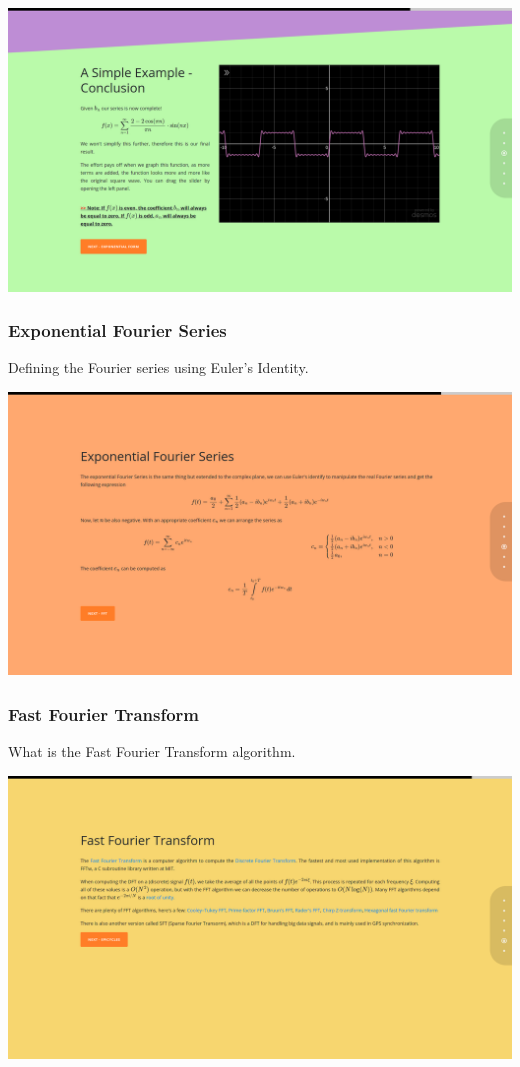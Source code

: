 \documentclass{article}
\begin{document}
\includegraphics[width=\textwidth]{chap14.png}

\subsubsection{Exponential Fourier Series}

Defining the Fourier series using Euler's Identity.

\includegraphics[width=\textwidth]{chap15.png}

\subsubsection{Fast Fourier Transform}

What is the Fast Fourier Transform algorithm.

\includegraphics[width=\textwidth]{chap16.png}
\end{document}
